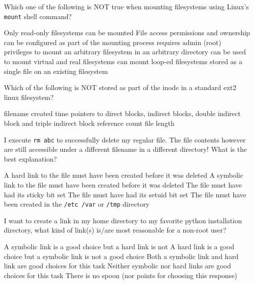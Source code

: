 \variant
Which one of the following is NOT true when mounting filesystems using Linux's {\tt mount} shell command?
\begin{answers}
\correctanswer Only read-only filesystems can be mounted
\answer File access permissions and ownership can be configured as part of the mounting process
 requires admin (root) privileges to mount an arbitrary filesystem in an arbitrary directory
 can be used to mount virtual and real filesystems
 can mount loop-ed filesystems stored as a single file on an existing filesystem
\end{answers}
\begin{solution}
\end{solution}

\variant
Which of the following is NOT stored as part of the inode in a standard ext2 linux filesystem?
\begin{answers}
\correctanswer filename
\answer created time
\answer pointers to direct blocks, indirect blocks, double indirect block and triple indirect block
\answer reference count
\answer file length
\end{answers}
\begin{solution}
\end{solution}

\variant
I execute {\tt rm abc} to successfully delete my regular file. The file contents however are still accessible under a different filename in a different directory! What is the best explanation?
\begin{answers}
\correctanswer A hard link to the file must have been created before it was deleted
\answer A symbolic link to the file must have been created before it was deleted
\answer The file must have had its sticky bit set
\answer The file must have had its setuid bit set
\answer The file must have been created in the {\tt /etc /var} or {\tt /tmp} directory
\end{answers}
\begin{solution}
\end{solution}


\variant
I want to create a link in my home directory to my favorite python installation directory, what kind of link(s) is/are most reasonable for a non-root user?
\begin{answers}
\correctanswer A symbolic link is a good choice but a hard link is not
\answer A hard link is a good choice but a symbolic link is not a good choice
\answer Both a symbolic link and hard link are good choices for this task
\answer Neither symbolic nor hard links are good choices for this task
\answer There is no spoon (nor points for choosing this response)
\end{answers}
\begin{solution}
\end{solution}

